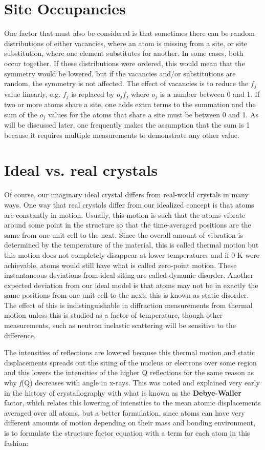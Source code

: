 \section{Site Occupancies}\label{ref:occupancies}
One factor that must also be considered is that sometimes there can be random distributions of either vacancies, where an atom is missing from a site, or site substitution, where one element substitutes for another. In some cases, both occur together. If these distributions were ordered, this would mean that the symmetry would be lowered, but if the vacancies and/or substitutions are random, the symmetry is not affected. The effect of vacancies is to reduce the $f_j$ value linearly, e.g.  $f_j$ is replaced by  $o_j f_j$ where $o_j$ is a number between 0 and 1. If two or more atoms share a site, one adds extra terms to the summation and the sum of the  $o_j$ values for the atoms that share a site must be between 0 and 1. As will be discussed later, one frequently makes the assumption that the sum is 1 because it requires multiple measurements to demonstrate any other value. 

\section{Ideal vs. real crystals}
Of course, our imaginary ideal crystal differs from real-world crystals in many ways. One way that real crystals differ from our idealized concept is that atoms are constantly in motion. Usually, this motion is such that the atoms vibrate around some point in the structure so that the time-averaged positions are the same from one unit cell to the next. Since the overall amount of vibration is determined by the temperature of the material, this is called thermal motion but this motion does not completely disappear at lower temperatures and if 0 K were achievable, atoms would still have what is called zero-point motion. These instantaneous deviations from ideal siting are called dynamic disorder. Another expected deviation from our ideal model is that atoms may not be in exactly the same positions from one unit cell to the next; this is known as static disorder. The effect of this is indistinguishable in diffraction measurements from thermal motion unless this is studied as a factor of temperature, though other measurements, such as neutron inelastic scattering will be sensitive to the difference. 

The intensities of reflections are lowered because this thermal motion and static displacements spreads out the siting of the nucleus or electrons over some region and this lowers the intensities of the higher Q reflections for the same reason as why \textit{f}(Q) decreases with angle in x-rays. This was noted and explained very early in the history of crystallography with what is known as the \textbf{Debye-Waller} factor\label{Debye-Waller factor}, which relates this lowering of intensities to the mean atomic displacements averaged over all atoms, but a better formulation, since atoms can have very different amounts of motion depending on their mass and bonding environment, is to formulate the structure factor equation with a term for each atom in this fashion:

